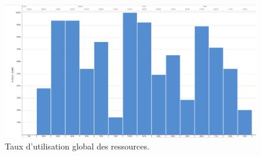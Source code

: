         \begin{landscape}
            \begin{figure}
                \centering
                \includegraphics[height=0.70\textwidth]{figure/TauxUtilisation.png}
                \caption{Taux d'utilisation global des ressources.}
                \label{fig:taux_utilisation}
            \end{figure}
        \end{landscape}

